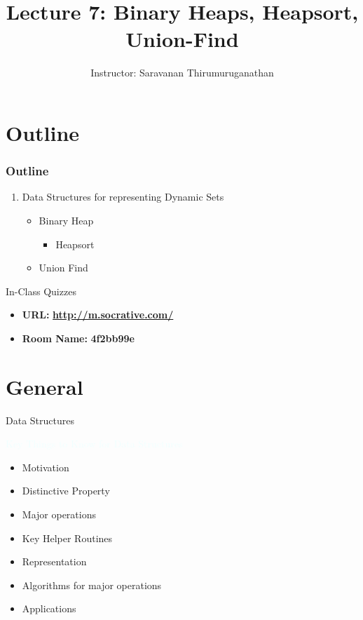 \documentclass{beamer}
\title[Saravanan Thirumuruganathan] 
{Lecture 7: Binary Heaps, Heapsort, Union-Find}
\author[CSE 5311] 
{Instructor: Saravanan Thirumuruganathan}
\date[]
\newcommand{\tblue}[1]{{\Large {\textcolor{azure}{#1}}}}
\begin{document}
\begin{frame}
  \titlepage
\end{frame}


\section{Outline}

\begin{frame}
\frametitle {Outline}
\begin{enumerate}
\item Data Structures for representing Dynamic Sets
\begin{itemize}
    \item Binary Heap
    \begin{itemize}
        \item Heapsort
    \end{itemize}
    \item Union Find
\end{itemize}
\end{enumerate}
\end{frame}

\begin{frame}{In-Class Quizzes}
\begin{itemize}
\item {\Large {\bf URL:}} {\LARGE \bf \url{http://m.socrative.com/}} 
\item {\Large {\bf Room Name:} {\LARGE \bf 4f2bb99e}}
\end{itemize}
\end{frame}

\section{General}

\begin{frame}{Data Structures}

\tblue{Key Things to Know for Data Structures}
\begin{itemize}
    \item Motivation
    \item Distinctive Property
    \item Major operations
    \item Key Helper Routines
    \item Representation
    \item Algorithms for major operations
    \item Applications
\end{itemize}
\end{frame}
\end{document}
